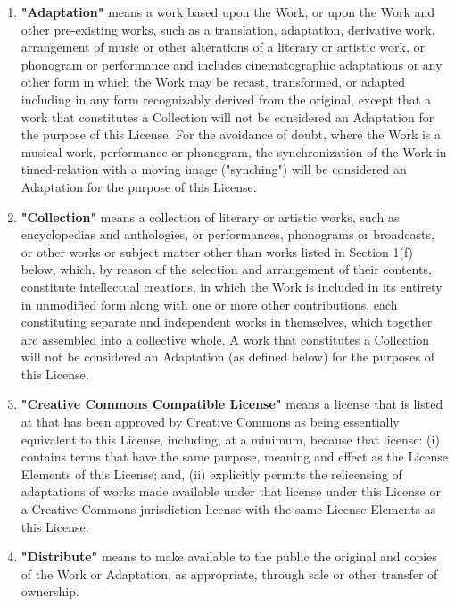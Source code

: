 \begin{enumerate}
\item \textbf{"Adaptation"} means a work based upon
  the Work, or upon the Work and other pre-existing works,
  such as a translation, adaptation, derivative work,
  arrangement of music or other alterations of a literary
  or artistic work, or phonogram or performance and
  includes cinematographic adaptations or any other form in
  which the Work may be recast, transformed, or adapted
  including in any form recognizably derived from the
  original, except that a work that constitutes a
  Collection will not be considered an Adaptation for the
  purpose of this License. For the avoidance of doubt,
  where the Work is a musical work, performance or
  phonogram, the synchronization of the Work in
  timed-relation with a moving image ("synching") will be
  considered an Adaptation for the purpose of this
  License.

\item \textbf{"Collection"} means a collection of
  literary or artistic works, such as encyclopedias and
  anthologies, or performances, phonograms or broadcasts,
  or other works or subject matter other than works listed
  in Section 1(f) below, which, by reason of the selection
  and arrangement of their contents, constitute
  intellectual creations, in which the Work is included in
  its entirety in unmodified form along with one or more
  other contributions, each constituting separate and
  independent works in themselves, which together are
  assembled into a collective whole. A work that
  constitutes a Collection will not be considered an
  Adaptation (as defined below) for the purposes of this
  License.

\item \textbf{"Creative Commons Compatible
  License"} means a license that is listed at
   that has
  been approved by Creative Commons as being essentially
  equivalent to this License, including, at a minimum,
  because that license: (i) contains terms that have the
  same purpose, meaning and effect as the License Elements
  of this License; and, (ii) explicitly permits the
  relicensing of adaptations of works made available under
  that license under this License or a Creative Commons
  jurisdiction license with the same License Elements as
  this License.

\item \textbf{"Distribute"} means to make available
  to the public the original and copies of the Work or
  Adaptation, as appropriate, through sale or other
  transfer of ownership.


\end{enumerate}
